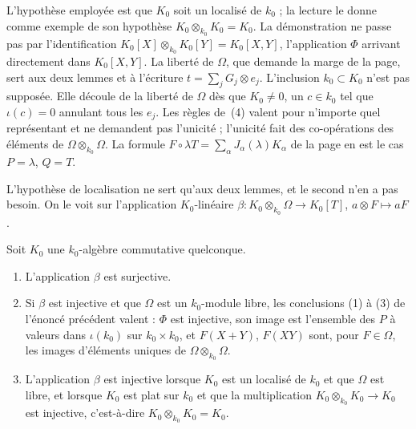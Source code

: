 \begin{remarque}
L'hypothèse employée est que $K_0$ soit un localisé de $k_0$ ; la lecture le donne comme exemple de son hypothèse $K_0 \otimes_{k_0} K_0 = K_0$. La démonstration ne passe pas par l'identification $K_0[X] \otimes_{k_0} K_0[Y] = K_0[X, Y]$, l'application $\Phi$ arrivant directement dans $K_0[X, Y]$. La liberté de $\Omega$, que demande la marge de la page, sert aux deux lemmes et à l'écriture $t = \sum_j G_j \otimes e_j$. L'inclusion $k_0 \subset K_0$ n'est pas supposée. Elle découle de la liberté de $\Omega$ dès que $K_0 \neq 0$, un $c \in k_0$ tel que $\iota(c) = 0$ annulant tous les $e_j$. Les règles de~(4) valent pour n'importe quel représentant et ne demandent pas l'unicité ; l'unicité fait des co-opérations des éléments  de $\Omega \otimes_{k_0} \Omega$. La formule $F \circ \lambda T = \sum_\alpha J_\alpha(\lambda) K_\alpha$ de la page en est le cas $P = \lambda$, $Q = T$.
\end{remarque}

L'hypothèse de localisation ne sert qu'aux deux lemmes, et le second n'en a pas besoin. On le voit sur l'application $K_0$-linéaire $\beta : K_0 \otimes_{k_0} \Omega \to K_0[T]$, $a \otimes F \mapsto aF$.

\begin{enonce}
Soit $K_0$ une $k_0$-algèbre commutative quelconque.
\begin{enumerate}
\item L'application $\beta$ est surjective.
\item Si $\beta$ est injective et que $\Omega$ est un $k_0$-module libre, les conclusions (1) à (3) de l'énoncé précédent valent : $\Phi$ est injective, son image est l'ensemble des $P$ à valeurs dans $\iota(k_0)$ sur $k_0 \times k_0$, et $F(X + Y)$, $F(XY)$ sont, pour $F \in \Omega$, les images d'éléments uniques de $\Omega \otimes_{k_0} \Omega$.
\item L'application $\beta$ est injective lorsque $K_0$ est un localisé de $k_0$ et que $\Omega$ est libre, et lorsque $K_0$ est plat sur $k_0$ et que la multiplication $K_0 \otimes_{k_0} K_0 \to K_0$ est injective, c'est-à-dire $K_0 \otimes_{k_0} K_0 = K_0$.
\end{enumerate}
\end{enonce}

